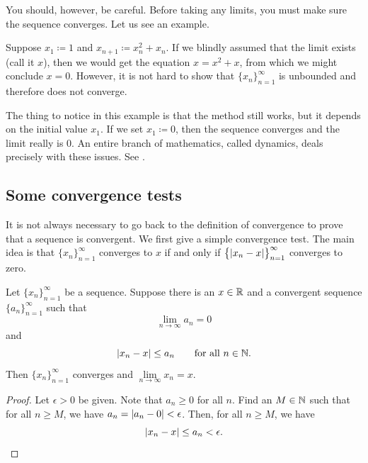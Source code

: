 You should, however, be careful.  Before taking any limits, you must
make sure the sequence converges.  Let us see an example.

\begin{example}
Suppose $x_1 \coloneqq 1$ and $x_{n+1} \coloneqq x_n^2+x_n$.
If we blindly assumed that the limit exists (call it $x$), then we
would get the equation $x = x^2+x$, from which we might
conclude $x=0$.  However, it is not hard
to show that $\{ x_n \}_{n=1}^\infty$ is unbounded and therefore does not converge.

The thing to notice in this example is that the method still works, but
it depends on the initial value $x_1$.  If we set $x_1 \coloneqq 0$,
then the sequence converges and the limit really is 0.
An entire branch of mathematics, called dynamics, deals precisely with these
issues.
See
.
\end{example}

\subsection{Some convergence tests}

It is not always necessary to go back to the definition of convergence
to prove that a sequence is convergent.  We first give a simple convergence test.
The main idea is that 
$\{ x_n \}_{n=1}^\infty$ converges to $x$ if and only if 
$\bigl\{ \lvert { x_n - x } \rvert \bigr\}_{n=1}^\infty$ converges to zero.

\begin{prop} \label{convzero:prop}
Let $\{ x_n \}_{n=1}^\infty$ be a sequence. 
Suppose there is an $x \in {\mathbb{R}}$
and a convergent sequence $\{ a_n \}_{n=1}^\infty$
such that
\begin{equation*}
\lim_{n\to\infty} a_n = 0
\end{equation*}
and 
\begin{equation*}
\lvert {x_n - x} \rvert \leq a_n
\qquad
\text{for all $n \in {\mathbb{N}}$.}
\end{equation*}
Then $\{ x_n \}_{n=1}^\infty$ converges and $\lim\limits_{n\to\infty} x_n = x$.
\end{prop}

\begin{proof}
Let $\epsilon > 0$ be given.  Note that $a_n \geq 0$
for all $n$.  Find an $M \in {\mathbb{N}}$ such that for
all $n \geq M$, we have
$a_n = \lvert {a_n - 0} \rvert < \epsilon$.  Then, for all $n \geq M$,
we have
\begin{equation*}
\lvert {x_n - x} \rvert \leq a_n < \epsilon . \qedhere
\end{equation*}
\end{proof}

